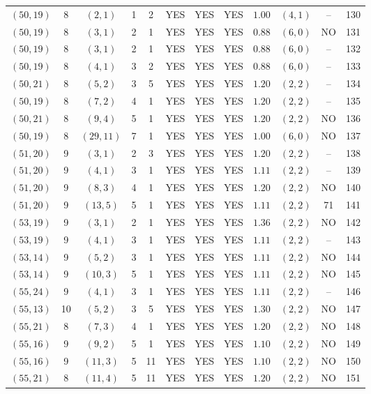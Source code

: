 \begin{longtable}{|c|c|c|c|c|c|c|c|c|c|c|c|}
$(50,19)$ & 8 & $(2,1)$ & 1 & 2 & YES & YES & YES & $1.00$ & $(4,1)$ & -- & 130\\
$(50,19)$ & 8 & $(3,1)$ & 2 & 1 & YES & YES & YES & $0.88$ & $(6,0)$ & NO & 131\\
$(50,19)$ & 8 & $(3,1)$ & 2 & 1 & YES & YES & YES & $0.88$ & $(6,0)$ & -- & 132\\
$(50,19)$ & 8 & $(4,1)$ & 3 & 2 & YES & YES & YES & $0.88$ & $(6,0)$ & -- & 133\\
$(50,21)$ & 8 & $(5,2)$ & 3 & 5 & YES & YES & YES & $1.20$ & $(2,2)$ & -- & 134\\
$(50,19)$ & 8 & $(7,2)$ & 4 & 1 & YES & YES & YES & $1.20$ & $(2,2)$ & -- & 135\\
$(50,21)$ & 8 & $(9,4)$ & 5 & 1 & YES & YES & YES & $1.20$ & $(2,2)$ & NO & 136\\
$(50,19)$ & 8 & $(29,11)$ & 7 & 1 & YES & YES & YES & $1.00$ & $(6,0)$ & NO & 137\\
$(51,20)$ & 9 & $(3,1)$ & 2 & 3 & YES & YES & YES & $1.20$ & $(2,2)$ & -- & 138\\
$(51,20)$ & 9 & $(4,1)$ & 3 & 1 & YES & YES & YES & $1.11$ & $(2,2)$ & -- & 139\\
$(51,20)$ & 9 & $(8,3)$ & 4 & 1 & YES & YES & YES & $1.20$ & $(2,2)$ & NO & 140\\
$(51,20)$ & 9 & $(13,5)$ & 5 & 1 & YES & YES & YES & $1.11$ & $(2,2)$ & 71 & 141\\
$(53,19)$ & 9 & $(3,1)$ & 2 & 1 & YES & YES & YES & $1.36$ & $(2,2)$ & NO & 142\\
$(53,19)$ & 9 & $(4,1)$ & 3 & 1 & YES & YES & YES & $1.11$ & $(2,2)$ & -- & 143\\
$(53,14)$ & 9 & $(5,2)$ & 3 & 1 & YES & YES & YES & $1.11$ & $(2,2)$ & NO & 144\\
$(53,14)$ & 9 & $(10,3)$ & 5 & 1 & YES & YES & YES & $1.11$ & $(2,2)$ & NO & 145\\
$(55,24)$ & 9 & $(4,1)$ & 3 & 1 & YES & YES & YES & $1.11$ & $(2,2)$ & -- & 146\\
$(55,13)$ & 10 & $(5,2)$ & 3 & 5 & YES & YES & YES & $1.30$ & $(2,2)$ & NO & 147\\
$(55,21)$ & 8 & $(7,3)$ & 4 & 1 & YES & YES & YES & $1.20$ & $(2,2)$ & NO & 148\\
$(55,16)$ & 9 & $(9,2)$ & 5 & 1 & YES & YES & YES & $1.10$ & $(2,2)$ & NO & 149\\
$(55,16)$ & 9 & $(11,3)$ & 5 & 11 & YES & YES & YES & $1.10$ & $(2,2)$ & NO & 150\\
$(55,21)$ & 8 & $(11,4)$ & 5 & 11 & YES & YES & YES & $1.20$ & $(2,2)$ & NO & 151\\

\end{longtable}
